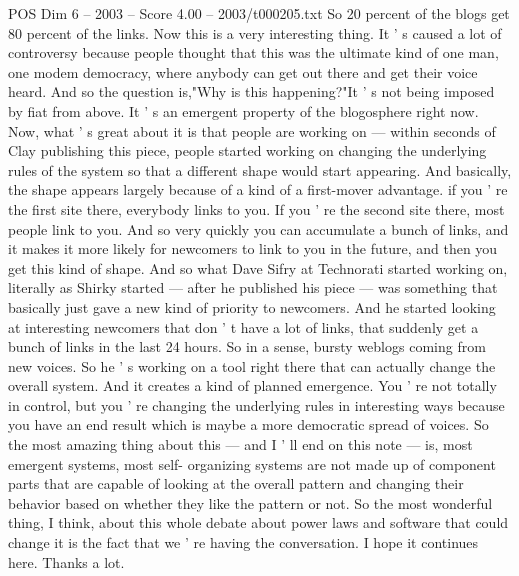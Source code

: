 \begin{textsample}{POS Dim 6 – 2003 – Score 4.00 – 2003/t000205.txt}
So 20 percent of the blogs get 80 percent of the links.
Now this is a very interesting thing.
It ' s caused a lot of controversy because people thought that this was the ultimate kind of one man, one modem democracy, where anybody can get out there and get their voice heard.
And so the question is,"Why is this happening?"It ' s not being imposed by fiat from above.
It ' s an emergent property of the blogosphere right now.
Now, what ' s great about it is that people are working on — within seconds of Clay publishing this piece, people started working on changing the underlying rules of the system so that a different shape would start appearing.
And basically, the shape appears largely because of a kind of a first-mover advantage. if you ' re the first site there, everybody links to you.
If you ' re the second site there, most people link to you.
And so very quickly you can accumulate a bunch of links, and it makes it more likely for newcomers to link to you in the future, and then you get this kind of shape.
And so what Dave Sifry at Technorati started working on, literally as Shirky started — after he published his piece — was something that basically just gave a new kind of priority to newcomers.
And he started looking at interesting newcomers that don ' t have a lot of links, that suddenly get a bunch of links in the last 24 hours.
So in a sense, bursty weblogs coming from new voices.
So he ' s working on a tool right there that can actually change the overall system.
And it creates a kind of planned emergence.
You ' re not totally in control, but you ' re changing the underlying rules in interesting ways because you have an end result which is maybe a more democratic spread of voices.
So the most amazing thing about this — and I ' ll end on this note — is, most emergent systems, most self- organizing systems are not made up of component parts that are capable of looking at the overall pattern and changing their behavior based on whether they like the pattern or not.
So the most wonderful thing, I think, about this whole debate about power laws and software that could change it is the fact that we ' re having the conversation.
I hope it continues here.
Thanks a lot.

\end{textsample}
